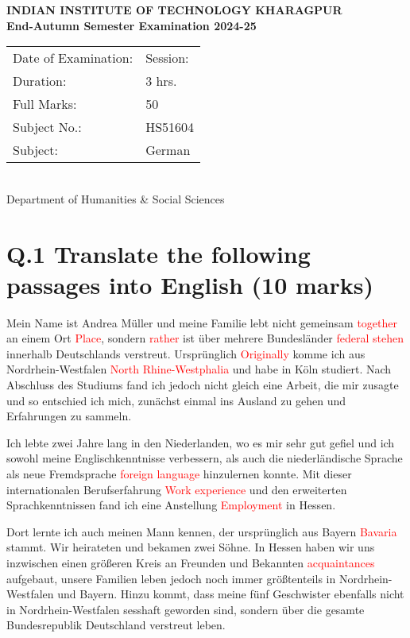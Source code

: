 \documentclass[a4paper,12pt]{article}
\begin{document}
\begin{center}
    \textbf{INDIAN INSTITUTE OF TECHNOLOGY KHARAGPUR}\\
    \textbf{End-Autumn Semester Examination 2024-25}\\
    \vspace{0.5cm}
    \begin{tabular}{l l}
        Date of Examination: & \hspace{2cm} Session: \\
        Duration: & 3 hrs. \\
        Full Marks: & 50 \\
        Subject No.: & HS51604 \\
        Subject: & German \\
    \end{tabular}\\
    \vspace{0.5cm}
    Department of Humanities \& Social Sciences
\end{center}

\vspace{1cm}

\section*{Q.1 Translate the following passages into English (10 marks)}

Mein Name ist Andrea Müller und meine Familie lebt nicht gemeinsam \textcolor{red}{together} an einem Ort \textcolor{red}{Place}, sondern \textcolor{red}{rather} ist über mehrere Bundesländer \textcolor{red}{federal stehen} innerhalb Deutschlands verstreut. Ursprünglich \textcolor{red}{Originally} komme ich aus Nordrhein-Westfalen \textcolor{red}{North Rhine-Westphalia
} und habe in Köln studiert. Nach Abschluss des Studiums fand ich jedoch nicht gleich eine Arbeit, die mir zusagte und so entschied ich mich, zunächst einmal ins Ausland zu gehen und Erfahrungen zu sammeln.

Ich lebte zwei Jahre lang in den Niederlanden, wo es mir sehr gut gefiel und ich sowohl meine Englischkenntnisse verbessern, als auch die niederländische Sprache als neue Fremdsprache \textcolor{red}{foreign language} hinzulernen konnte. Mit dieser internationalen Berufserfahrung \textcolor{red}{Work experience} und den erweiterten Sprachkenntnissen fand ich eine Anstellung \textcolor{red}{Employment} in Hessen.

Dort lernte ich auch meinen Mann kennen, der ursprünglich aus Bayern \textcolor{red}{Bavaria} stammt. Wir heirateten und bekamen zwei Söhne. In Hessen haben wir uns inzwischen einen größeren Kreis an Freunden und Bekannten \textcolor{red}{acquaintances} aufgebaut, unsere Familien leben jedoch noch immer größtenteils in Nordrhein-Westfalen und Bayern. Hinzu kommt, dass meine fünf Geschwister ebenfalls nicht in Nordrhein-Westfalen sesshaft geworden sind, sondern über die gesamte Bundesrepublik Deutschland verstreut leben.
\end{document}
